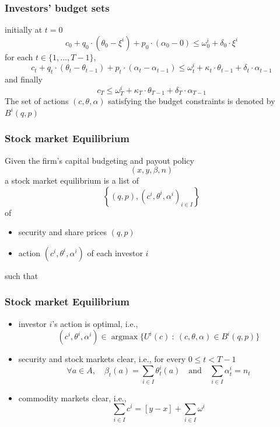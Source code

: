 \documentclass[blue]{beamer}
\def\leq{\leqslant}
\def\et{\quad \textrm{and} \quad}
\DeclareMathOperator\argmax{argmax}
\theoremstyle{definition}
\theoremstyle{example}
\begin{document}

\begin{frame}\frametitle{Investors' budget sets}

initially at $t=0$
\begin{equation}\label{eq:budget-0-quatro}
c_0 + q_0\cdot (\theta_0 - \xi^i) + p_0 \cdot (\alpha_0 - 0) \leq \omega^i_0 +  \delta_0 \cdot \xi^i
\end{equation}
for each $t\in \{1,\ldots,T-1\}$,
\begin{equation}\label{eq:budget-t-quatro}
c_t + q_t\cdot (\theta_t - \theta_{t-1}) + p_t \cdot (\alpha_t-\alpha_{t-1}) \leq \omega^i_t + \kappa_t \cdot \theta_{t-1} + \delta_t  \cdot \alpha_{t-1}
\end{equation}
and finally
\[
c_T \leq \omega^i_T + \kappa_T \cdot \theta_{T-1} + \delta_T \cdot \alpha_{T-1}
\]
The set of actions $(c,\theta,\alpha)$ satisfying the budget constraints is denoted by $B^i(q,p)$
\end{frame}


\begin{frame}\frametitle{Stock market Equilibrium}

Given the firm's capital budgeting and payout policy
\[
(x,y,\beta,n)
\]
a stock market equilibrium is a list of
\[
\left\{ (q,p), (c^i,\theta^i,\alpha^i)_{i\in I}\right\}
\]
of
\begin{itemize}
\item security and share prices $(q,p)$
\item action $(c^i,\theta^i,\alpha^i)$ of each investor $i$
\end{itemize}
such that
\end{frame}


\begin{frame}\frametitle{Stock market Equilibrium}

\begin{itemize}
\item[(a)] investor $i$'s action is optimal, i.e.,
\[
(c^i,\theta^i,\alpha^i) \in \argmax \{ U^i(c) \ \colon \ (c,\theta,\alpha) \in B^i(q, p) \}
\]
\item[(b)] security and stock markets clear, i.e., for every $0\leq t<T-1$
\[
\forall a\in A, \quad \beta_t(a) = \sum_{i\in I} \theta^i_t(a) \et \sum_{i\in I} \alpha^i_t =n_t
\]
\item[(c)] commodity markets clear, i.e.,
\[
\sum_{i\in I} c^i = [y - x] + \sum_{i\in I} \omega^i
\]
\end{itemize}

\end{frame}
\end{document}
